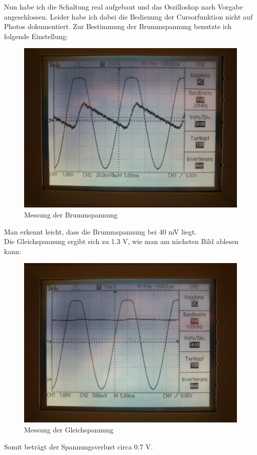 Nun habe ich die Schaltung real aufgebaut und das Oszilloskop nach Vorgabe angeschlossen. Leider habe ich dabei die Bedienung der Cursorfunktion nicht auf Photos dokumentiert.
Zur Bestimmung der Brummspannung benutzte ich folgende Einstellung:
\begin{figure}[H]
	\centering
	\includegraphics[width=\linewidth]{versuch2/oszi/DSC_0222.JPG}
	\caption{Messung der Brummspannung}
\end{figure}
Man erkennt leicht, dass die Brummspannung bei 40 mV liegt.\\
Die Gleichspannung ergibt sich zu 1.3 V, wie man am nächsten Bild ablesen kann:
\begin{figure}[H]
	\centering
	\includegraphics[width=\linewidth]{versuch2/oszi/DSC_0225.JPG}
	\caption{Messung der Gleichspannung}
\end{figure}
Somit beträgt der Spannungsverlust circa 0.7 V.

